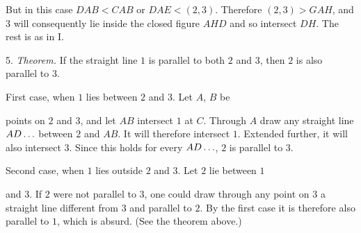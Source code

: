 But in this case $DAB < CAB$ or $DAE < (2,3)$. Therefore $(2,3) > GAH$, and $3$ will consequently lie inside the closed figure $AHD$ and so intersect $DH$. The rest is as in I.

5. \emph{Theorem.} If the straight line $1$ is parallel to both $2$ and $3$, then $2$ is also parallel to $3$.

 First case, when $1$ lies between $2$ and $3$. Let $A$, $B$ be

\begin{center}

\end{center}
\noindent points on $2$ and $3$, and let $AB$ intersect $1$ at $C$. Through $A$ draw any straight line $AD\mathinner{.\,.\,.}$ between $2$ and $AB$. It will therefore intersect $1$. Extended further, it will also intersect $3$. Since this holds for every $AD\mathinner{.\,.\,.}$, $2$ is parallel to $3$.

Second case, when $1$ lies outside $2$ and $3$. Let $2$ lie between $1$

\begin{center}

\end{center}
\noindent and $3$. If $2$ were not parallel to $3$, one could draw through any point on $3$ a straight line different from $3$ and parallel to $2$. By the first case it is therefore also parallel to $1$, which is absurd. (See the theorem above.)

